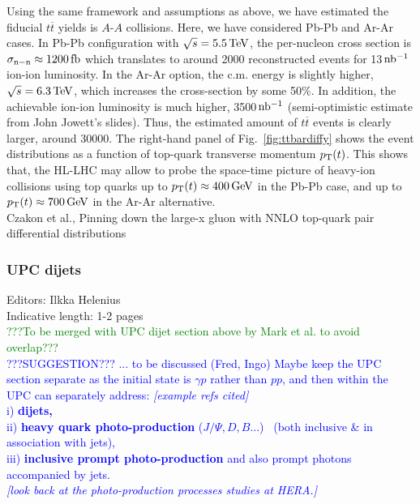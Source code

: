 \documentclass[../report.tex]{subfiles}
\begin{document}
Using the same framework and assumptions as above, we have estimated the fiducial $t\overline{t}$ yields is $A$-$A$ collisions. Here, we have considered Pb-Pb and Ar-Ar cases. In Pb-Pb configuration with $\sqrt{s} = 5.5 \, {\rm TeV}$, the per-nucleon cross section is $\sigma_{\rm n-n} \approx 1200 \, {\rm fb}$ which translates to around 2000 reconstructed events for 13$\, \rm nb^{-1}$ ion-ion luminosity. In the Ar-Ar option, the c.m. energy is slightly higher, $\sqrt{s} = 6.3 \, {\rm TeV}$, which increases the cross-section by some 50\%. In addition, the achievable ion-ion luminosity is much higher, 3500$\,\rm nb^{-1}$ (semi-optimistic estimate from John Jowett's slides). Thus, the estimated amount of $t\overline{t}$ events is clearly larger, around 30000. The right-hand panel of Fig.~\ref{fig:ttbardiffy} shows the event distributions as a function of top-quark transverse momentum $p_{\rm T}(t)$. This shows that, the HL-LHC may allow to probe the space-time picture of heavy-ion collisions using top quarks \cite{Apolinario:2017sob} up to $p_{\rm T}(t) \approx 400\,{\rm GeV}$ in the Pb-Pb case, and up to $p_{\rm T}(t) \approx 700\,{\rm GeV}$ in the Ar-Ar alternative. \\




Czakon et al., Pinning down the large-x gluon with NNLO top-quark pair
                        differential distributions   \cite{Czakon:2016olj}

\subsubsection{UPC dijets}
Editors: Ilkka Helenius\\
Indicative length: 1-2 pages\\
\textcolor{green}{???To be merged with UPC dijet section above by Mark et al. to avoid overlap???}\\
\textcolor{blue}{ ???SUGGESTION??? ... to be discussed (Fred, Ingo) 
Maybe keep the UPC section separate as the initial state is   $\gamma p$ rather than $p p$, and 
then within the UPC can separately address: {\it [example refs cited]}\\ 
i)\textbf{ dijets,} \\
ii) \textbf{heavy quark photo-production }($J/\Psi, D, B ...$)~\cite{Aktas:2005bt} (both inclusive \& in association with jets), \\
iii) \textbf{inclusive prompt photo-production} and also prompt photons accompanied by jets.~\cite{Bussey:2001xg,Chwastowski:2003aw}\\
{\it [look back at the photo-production processes studies at HERA.]}
}
\end{document}
